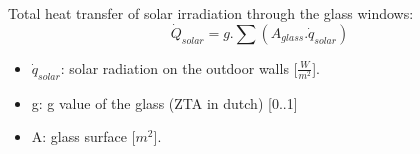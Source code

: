Total heat transfer of solar irradiation through the glass windows: 
\begin{equation}
\dot{Q}_{solar}=g.\sum(A_{glass}.\dot{q}_{solar})
\end{equation}

\begin{itemize}
    \item $\dot{q}_{solar}$: solar radiation on the outdoor walls [$\frac{W}{m^2}$]. 
    \item g: g value of the glass (ZTA in dutch) [0..1]\cite{zontoetreding}
    \item A: glass surface [$m^2$].
\end{itemize}



\newpage
